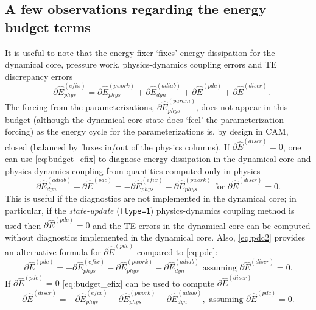 \documentclass{agujournal}
\newcommand*{\gi}[1]{\widehat{#1}}
\begin{document}
\subsection{A few observations regarding the energy budget terms}
It is useful to note that the energy fixer `fixes' energy dissipation for the dynamical core, pressure work, physics-dynamics coupling errors and TE discrepancy errors
\begin{equation}
\label{eq:budget_efix}
-\partial \gi{E}_{phys}^{({efix})}=\partial \gi{E}_{phys}^{({pwork})}+\partial \gi{E}_{dyn}^{({adiab})}+\partial \gi{E}^{({pdc})}+\partial \gi{E}^{({discr})}.
\end{equation}
The forcing from the parameterizations, $\partial \gi{E}_{phys}^{({param})}$, does not appear in this budget (although the dynamical core state does `feel' the parameterization forcing) as the energy cycle for the parameterizations is, by design in CAM, closed (balanced by fluxes in/out of the physics columns). If $\partial \gi{E}^{({discr})}=0$, one can use \eqref{eq:budget_efix} to diagnose energy dissipation in the dynamical core and physics-dynamics coupling from quantities computed only in physics
\begin{equation}
\label{eq:pdc2}
\partial \gi{E}_{dyn}^{({adiab})}+\partial \gi{E}^{({pdc})}=-\partial \gi{E}_{phys}^{({efix})}-\partial \gi{E}_{phys}^{({pwork})} \text{ for  }\partial \gi{E}^{({discr})}=0.
\end{equation}
This is useful if the diagnostics are not implemented in the dynamical core; in particular, if the {\em{state-update}} ({\tt{ftype=1}}) physics-dynamics coupling method is used then $\partial \gi{E}^{({pdc})}=0$ and the TE errors in the dynamical core can be computed without diagnostics implemented in the dynamical core. Also, \eqref{eq:pdc2} provides an alternative formula for $\partial \gi{E}^{({pdc})}$ compared to \eqref{eq:pdc}:
\begin{equation}
\label{eq:pdc3}
\partial \gi{E}^{({pdc})}=-\partial \gi{E}_{phys}^{({efix})}-\partial \gi{E}_{phys}^{({pwork})}-\partial \gi{E}_{dyn}^{({adiab})} \text{ assuming }\partial \gi{E}^{({discr})}=0.
\end{equation}
If $\partial \gi{E}^{({pdc})}=0$ \eqref{eq:budget_efix} can be used to compute $\partial \gi{E}^{({discr})}$
\begin{equation}
\label{eq:discre}
\partial \gi{E}^{({discr})}=-\partial \gi{E}_{phys}^{({efix})}-\partial \gi{E}_{phys}^{({pwork})}-\partial \gi{E}_{dyn}^{({adiab})}, \text{ assuming }\partial \gi{E}^{(pdc)}=0.
\end{equation}
\end{document}
